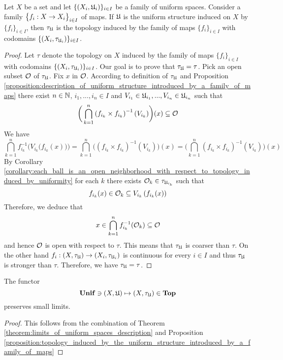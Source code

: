 \begin{proposition}\label{proposition:topology_induced_by_the_uniform_structure_introduced_by_a_family_of_maps}
Let $X$ be a set and let $\{(X_i,{\mathfrak U}_i)\}_{i\in I}$ be a family of uniform spaces. Consider a family $\big\{f_i:X\rightarrow X_i\big\}_{i\in I}$ of maps. If ${\mathfrak U}$ is the uniform structure induced on $X$ by $\{f_i\}_{i\in I}$, then $\tau_{{\mathfrak U}}$ is the topology induced by the family of maps $\{f_i\}_{i\in I}$ with codomains $\{(X_i,\tau_{{\mathfrak U}_i})\}_{i\in I}$.
\end{proposition}
\begin{proof}
Let $\tau$ denote the topology on $X$ induced by the family of maps $\{f_i\}_{i\in I}$ with codomains $\{(X_i,\tau_{{\mathfrak U}_i})\}_{i\in I}$. Our goal is to prove that $\tau_{{\mathfrak U}} = \tau$. Pick an open subset ${\mathcal O}$ of $\tau_{{\mathfrak U}}$. Fix $x$ in ${\mathcal O}$. According to definition of $\tau_{{\mathfrak U}}$ and Proposition \ref{proposition:description_of_uniform_structure_introduced_by_a_family_of_maps} there exist $n\in {\mathbb N}$, $i_1,...,i_n \in I$ and $V_{i_1}\in {\mathfrak U}_{i_1},...,V_{i_n}\in {\mathfrak U}_{i_n}$ such that 
$$\bigg(\bigcap_{k=1}^n\left(f_{i_k}\times f_{i_k}\right)^{-1}(V_{i_k})\bigg)(x) \subseteq {\mathcal O}$$ 
We have
$$\bigcap_{k=1}^nf_{i_k}^{-1}\bigg(V_{i_k}\big(f_{i_k}(x)\big)\bigg) = \bigcap_{k=1}^n\bigg(\left(f_{i_k}\times f_{i_k}\right)^{-1}(V_{i_k})\bigg)(x) = \bigg(\bigcap_{k=1}^n\left(f_{i_k}\times f_{i_k}\right)^{-1}(V_{i_k})\bigg)(x)$$
By Corollary \ref{corollary:each_ball_is_an_open_neighborhood_with_respect_to_topology_induced_by_uniformity} for each $k$ there exists ${\mathcal O}_{k}\in \tau_{{\mathfrak U}_{i_k}}$ such that 
$$f_{i_k}(x) \in {\mathcal O}_{k} \subseteq V_{i_k}\left(f_{i_k}(x)\right)$$
Therefore, we deduce that
$$x \in \bigcap_{k=1}^nf_{i_k}^{-1}({\mathcal O}_k) \subseteq {\mathcal O}$$
and hence ${\mathcal O}$ is open with respect to $\tau$. This means that $\tau_{{\mathfrak U}}$ is coarser than $\tau$. On the other hand $f_i:\left(X,\tau_{{\mathfrak U}}\right) \rightarrow \left(X_i,\tau_{{\mathfrak U}_i}\right)$ is continuous for every $i\in I$ and thus $\tau_{{\mathfrak U}}$ is stronger than $\tau$. Therefore, we have $\tau_{{\mathfrak U}} = \tau$.
\end{proof}

\begin{corollary}\label{corollary:induced_topology_functor_preserves_limits_of_uniform_spaces}
The functor 
$$\mathbf{Unif} \ni (X,{\mathfrak U}) \mapsto (X,\tau_{{\mathfrak U}}) \in \mathbf{Top}$$
preserves small limits.
\end{corollary}
\begin{proof}
This follows from the combination of Theorem \ref{theorem:limits_of_uniform_spaces_description} and Proposition \ref{proposition:topology_induced_by_the_uniform_structure_introduced_by_a_family_of_maps}
\end{proof}

